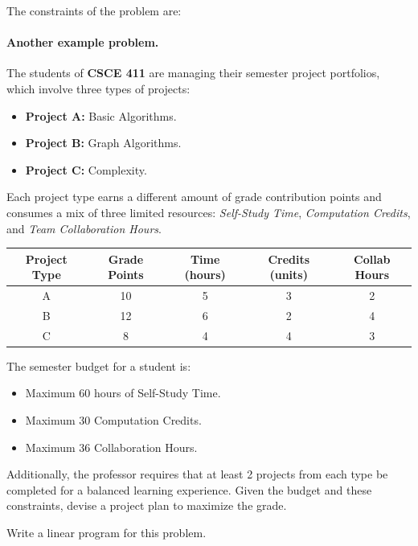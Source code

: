 \documentclass[11pt]{article}
\begin{document}
\vs{2cm}
The constraints of the problem are: 

\vs{4cm}
		
	
\newpage

\paragraph{Another example problem.} 
The students of \textbf{CSCE 411} are managing their semester project portfolios, which involve three types of projects:

\begin{itemize}
    \item \textbf{Project A:} Basic Algorithms.
    \item \textbf{Project B:} Graph Algorithms.
    \item \textbf{Project C:} Complexity. 
\end{itemize}

Each project type earns a different amount of grade contribution points and consumes a mix of three limited resources: \textit{Self-Study Time}, \textit{Computation Credits}, and \textit{Team Collaboration Hours}.

\begin{center}
\begin{tabular}{|c|c|c|c|c|}
\hline
\textbf{Project Type} & \textbf{Grade Points} & \textbf{Time (hours)} & \textbf{Credits (units)} & \textbf{Collab Hours} \\
\hline
A & 10 & 5 & 3 & 2 \\
B & 12 & 6 & 2 & 4 \\
C & 8 & 4 & 4 & 3 \\
\hline
\end{tabular}
\end{center}

The semester budget for a student is:
\begin{itemize}
    \item Maximum 60 hours of Self-Study Time.
    \item Maximum 30 Computation Credits.
    \item Maximum 36 Collaboration Hours.
\end{itemize}

Additionally, the professor requires that at least 2 projects from each type be completed for a balanced learning experience.
Given the budget and these constraints, devise a project plan to maximize the grade. 

\vs{1cm}
Write a linear program for this problem.
\end{document}
